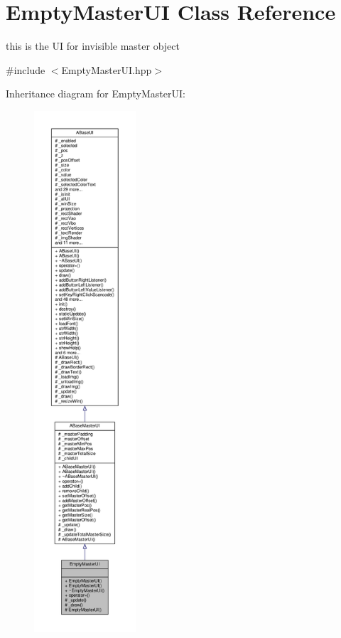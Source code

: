 \hypertarget{class_empty_master_u_i}{}\section{Empty\+Master\+UI Class Reference}
\label{class_empty_master_u_i}


this is the UI for invisible master object  




{\ttfamily \#include $<$Empty\+Master\+U\+I.\+hpp$>$}



Inheritance diagram for Empty\+Master\+UI\+:
\nopagebreak
\begin{figure}[H]
\begin{center}
\leavevmode
\includegraphics[height=550pt]{class_empty_master_u_i__inherit__graph}
\end{center}
\end{figure}


